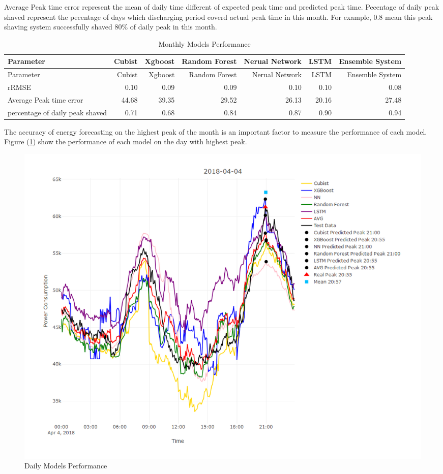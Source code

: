 \documentclass[
]{article}
\begin{document}
Average Peak time error represent the mean of daily time different of
expected peak time and predicted peak time. Pecentage of daily peak
shaved represent the pecentage of days which discharging period coverd
actual peak time in this month. For example, 0.8 mean this peak shaving
system successfully shaved 80\% of daily peak in this month.

\begin{longtable}[]{@{}lrrrrrr@{}}
\caption{Monthly Models Performance}\tabularnewline
\toprule
Parameter & Cubist & Xgboost & Random Forest & Nerual Network & LSTM &
Ensemble System\tabularnewline
\midrule
\endfirsthead
\toprule
Parameter & Cubist & Xgboost & Random Forest & Nerual Network & LSTM &
Ensemble System\tabularnewline
\midrule
\endhead
rRMSE & 0.10 & 0.09 & 0.09 & 0.10 & 0.10 & 0.08\tabularnewline
Average Peak time error & 44.68 & 39.35 & 29.52 & 26.13 & 20.16 &
27.48\tabularnewline
percentage of daily peak shaved & 0.71 & 0.68 & 0.84 & 0.87 & 0.90 &
0.94\tabularnewline
\bottomrule
\end{longtable}

The accuracy of energy forecasting on the highest peak of the month is
an important factor to measure the performance of each model. Figure
(\ref{fig:fig4}) show the performance of each model on the day with
highest peak.

\begin{figure}[H]
\includegraphics[width=1\linewidth]{model_performance} \caption{Daily Models Performance\label{fig4}}\label{fig:fig4}
\end{figure}
\end{document}
